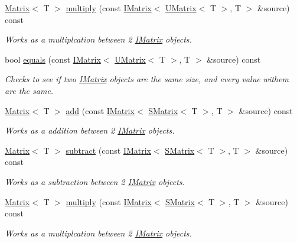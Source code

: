 \begin{DoxyCompactItemize}
\mbox{\hyperlink{class_matrix}{Matrix}}$<$ T $>$ \mbox{\hyperlink{class_matrix_a610817669271826873968ccaa3ac92e7}{multiply}} (const \mbox{\hyperlink{class_i_matrix}{I\+Matrix}}$<$ \mbox{\hyperlink{class_u_matrix}{U\+Matrix}}$<$ T $>$, T $>$ \&source) const
\begin{DoxyCompactList}\small\item\em Works as a multiplcation between 2 \mbox{\hyperlink{class_i_matrix}{I\+Matrix}} objects. \end{DoxyCompactList}\item 
bool \mbox{\hyperlink{class_matrix_a1764e0965a1ed7589988834086b10444}{equals}} (const \mbox{\hyperlink{class_i_matrix}{I\+Matrix}}$<$ \mbox{\hyperlink{class_u_matrix}{U\+Matrix}}$<$ T $>$, T $>$ \&source) const
\begin{DoxyCompactList}\small\item\em Checks to see if two \mbox{\hyperlink{class_i_matrix}{I\+Matrix}} objects are the same size, and every value withem are the same. \end{DoxyCompactList}\item 
\mbox{\hyperlink{class_matrix}{Matrix}}$<$ T $>$ \mbox{\hyperlink{class_matrix_a95b11bcadf40ded8ff18d2a61ab082c6}{add}} (const \mbox{\hyperlink{class_i_matrix}{I\+Matrix}}$<$ \mbox{\hyperlink{class_s_matrix}{S\+Matrix}}$<$ T $>$, T $>$ \&source) const
\begin{DoxyCompactList}\small\item\em Works as a addition between 2 \mbox{\hyperlink{class_i_matrix}{I\+Matrix}} objects. \end{DoxyCompactList}\item 
\mbox{\hyperlink{class_matrix}{Matrix}}$<$ T $>$ \mbox{\hyperlink{class_matrix_accba0b61ed5f2b23a4b77c613361689c}{subtract}} (const \mbox{\hyperlink{class_i_matrix}{I\+Matrix}}$<$ \mbox{\hyperlink{class_s_matrix}{S\+Matrix}}$<$ T $>$, T $>$ \&source) const
\begin{DoxyCompactList}\small\item\em Works as a subtraction between 2 \mbox{\hyperlink{class_i_matrix}{I\+Matrix}} objects. \end{DoxyCompactList}\item 
\mbox{\hyperlink{class_matrix}{Matrix}}$<$ T $>$ \mbox{\hyperlink{class_matrix_a5e6ec967ac129d9944ee1c735ea5407e}{multiply}} (const \mbox{\hyperlink{class_i_matrix}{I\+Matrix}}$<$ \mbox{\hyperlink{class_s_matrix}{S\+Matrix}}$<$ T $>$, T $>$ \&source) const
\begin{DoxyCompactList}\small\item\em Works as a multiplcation between 2 \mbox{\hyperlink{class_i_matrix}{I\+Matrix}} objects. \end{DoxyCompactList}\item 

\end{DoxyCompactItemize}
